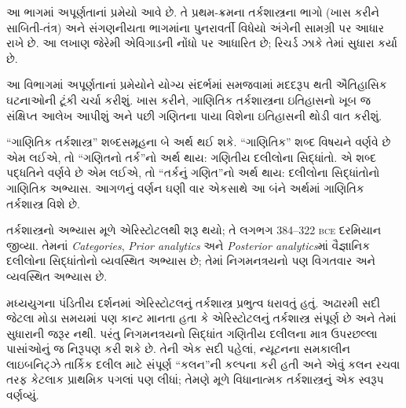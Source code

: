 
\label{guunit:OLP-0274}


\begin{editorial}
 આ ભાગમાં અપૂર્ણતાનાં પ્રમેયો આવે છે. તે પ્રથમ-ક્રમના
 તર્કશાસ્ત્રના ભાગો (ખાસ કરીને સાબિતી-તંત્ર) અને સંગણનીયતા
 ભાગમાંના પુનરાવર્તી વિધેયો અંગેની સામગ્રી પર આધાર રાખે છે.
 આ લખાણ જેરેમી એવિગાડની નોંધો પર આધારિત છે; રિચર્ડ ઝાકે
 તેમાં સુધારા કર્યા છે.
\end{editorial}

\begingroup
\makeatletter{}\makeatother

\label{guunit:OLP-0275}


\begingroup
\makeatletter{}\makeatother


\label{guunit:OLP-0276}


આ વિભાગમાં અપૂર્ણતાનાં પ્રમેયોને યોગ્ય સંદર્ભમાં સમજવામાં
મદદરૂપ થતી ઐતિહાસિક ઘટનાઓની ટૂંકી ચર્ચા કરીશું.
ખાસ કરીને, ગાણિતિક તર્કશાસ્ત્રના ઇતિહાસનો ખૂબ જ
સંક્ષિપ્ત આલેખ આપીશું અને પછી ગણિતના પાયા વિશેના
ઇતિહાસની થોડી વાત કરીશું.

\begin{digress}
  ``ગાણિતિક તર્કશાસ્ત્ર'' શબ્દસમૂહના બે અર્થ થઈ શકે.
  ``ગાણિતિક'' શબ્દ વિષયને વર્ણવે છે એમ લઈએ, તો
  ``ગણિતનો તર્ક''નો અર્થ થાય: ગણિતીય દલીલોના સિદ્ધાંતો.
  એ શબ્દ પદ્ધતિને વર્ણવે છે એમ લઈએ, તો ``તર્કનું ગણિત''નો
  અર્થ થાય: દલીલોના સિદ્ધાંતોનો ગાણિતિક અભ્યાસ.
  આગળનું વર્ણન ઘણી વાર એકસાથે આ બંને અર્થમાં ગાણિતિક
  તર્કશાસ્ત્ર વિશે છે.
\end{digress}

તર્કશાસ્ત્રનો અભ્યાસ મૂળે એરિસ્ટોટલથી શરૂ થયો; તે
લગભગ 384--322 \textsc{bce} દરમિયાન જીવ્યા.
તેમનાં \emph{Categories}, \emph{Prior
  analytics} અને \emph{Posterior analytics}માં
વૈજ્ઞાનિક દલીલોના સિદ્ધાંતોનો વ્યવસ્થિત અભ્યાસ છે;
તેમાં નિગમનત્રયનો પણ વિગતવાર અને વ્યવસ્થિત અભ્યાસ છે.

મધ્યયુગના પંડિતીય દર્શનમાં એરિસ્ટોટલનું તર્કશાસ્ત્ર
પ્રભુત્વ ધરાવતું હતું. અઢારમી સદી જેટલા મોડા સમયમાં પણ
કાન્ટ માનતા હતા કે એરિસ્ટોટલનું તર્કશાસ્ત્ર સંપૂર્ણ છે
અને તેમાં સુધારાની જરૂર નથી. પરંતુ નિગમનત્રયનો સિદ્ધાંત
ગણિતીય દલીલના માત્ર ઉપરછલ્લા પાસાંઓનું જ નિરૂપણ કરી
શકે છે. તેની એક સદી પહેલાં, ન્યૂટનના સમકાલીન લાઇબનિટ્ઝે
તાર્કિક દલીલ માટે સંપૂર્ણ ``કલન''ની કલ્પના કરી હતી અને
એવું કલન રચવા તરફ કેટલાક પ્રાથમિક પગલાં પણ લીધાં;
તેમણે મૂળે વિધાનાત્મક તર્કશાસ્ત્રનું એક સ્વરૂપ વર્ણવ્યું.

